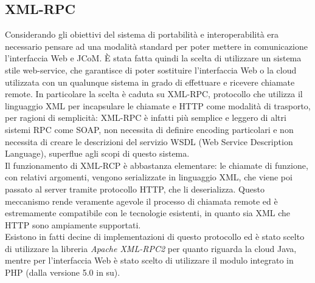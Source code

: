 \subsection{XML-RPC}
Considerando gli obiettivi del sistema di portabilità e interoperabilità era necessario pensare ad una modalità standard per poter mettere in comunicazione l'interfaccia Web e JCoM. È stata fatta quindi la scelta di utilizzare un sistema stile web-service, che garantisce di poter sostituire l'interfaccia Web o la cloud utilizzata con un qualunque sistema in grado di effettuare e ricevere chiamate remote. In particolare la scelta è caduta su XML-RPC, protocollo che utilizza il linguaggio XML per incapsulare le chiamate e HTTP come modalità di trasporto, per ragioni di semplicità: XML-RPC è infatti più semplice e leggero di altri sistemi RPC come SOAP, non necessita di definire encoding particolari e non necessita di creare le descrizioni del servizio WSDL (Web Service Description Language), superflue agli scopi di questo sistema.
\\Il funzionamento di XML-RCP è abbastanza elementare: le chiamate di funzione, con relativi argomenti, vengono serializzate in linguaggio XML, che viene poi passato al server tramite protocollo HTTP, che li deserializza. Questo meccanismo rende veramente agevole il processo di chiamata remote ed è estremamente compatibile con le tecnologie esistenti, in quanto sia XML che HTTP sono ampiamente supportati.
\\Esistono in fatti decine di implementazioni di questo protocollo ed è stato scelto di utilizzare la libreria \textit{Apache XML-RPC2} per quanto riguarda la cloud Java, mentre per l'interfaccia Web è stato scelto di utilizzare il modulo integrato in PHP (dalla versione 5.0 in su).

